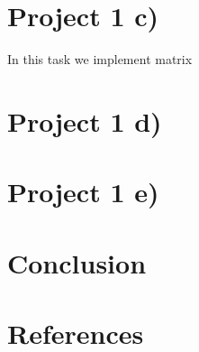 \documentclass{article}
\begin{document}
\section{Project 1 c)}
In this task we implement matrix 

\section{Project 1 d)}

\section{Project 1 e)}


\section{Conclusion}

\section{References}
\end{document}
